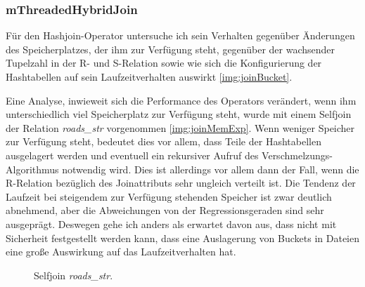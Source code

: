 \documentclass[a4paper,12pt,twoside]{article}
\newcommand{\Fb}[1]{\textit{#1}} %
\begin{document}
\subsubsection{mThreadedHybridJoin}
\label{exp:hash}

Für den Hashjoin-Operator untersuche ich sein Verhalten gegenüber Änderungen des Speicherplatzes, der ihm zur Verfügung steht, gegenüber der wachsender Tupelzahl in der R- und S-Relation sowie wie sich die Konfigurierung der Hashtabellen auf sein Laufzeitverhalten auswirkt \autoref{img:joinBucket}.

Eine Analyse, inwieweit sich die Performance des Operators verändert, wenn ihm unterschiedlich viel Speicherplatz zur Verfügung steht, wurde mit einem Selfjoin der Relation \Fb{roads\_str} vorgenommen \autoref{img:joinMemExp}. Wenn weniger Speicher zur Verfügung steht, bedeutet dies vor allem, dass Teile der Hashtabellen ausgelagert werden und eventuell ein rekursiver Aufruf des Verschmelzungs-Algorithmus notwendig wird. Dies ist allerdings vor allem dann der Fall, wenn die R-Relation bezüglich des Joinattributs sehr ungleich verteilt ist. Die Tendenz der Laufzeit bei steigendem zur Verfügung stehenden Speicher ist zwar deutlich abnehmend, aber die Abweichungen von der Regressionsgeraden sind sehr ausgeprägt. Deswegen gehe ich anders als erwartet davon aus, dass nicht mit Sicherheit festgestellt werden kann, dass eine Auslagerung von Buckets in Dateien eine große Auswirkung auf das Laufzeitverhalten hat.

\begin{figure}
	\centering
	\qquad	
	\caption{Selfjoin \Fb{roads\_str}.}
	\label{img:joinExpAllg}
\end{figure}
\end{document}
